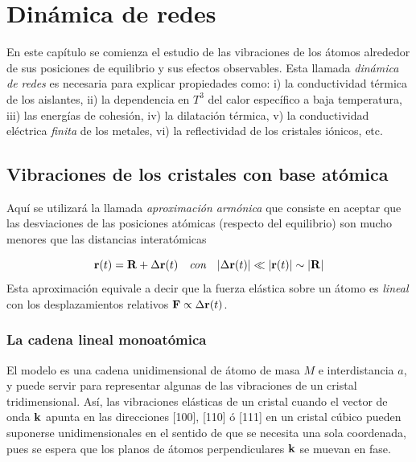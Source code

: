 
\chapter{Dinámica de redes} \label{Ch:04}

En este capítulo se comienza el estudio de las vibraciones de los átomos alrededor de sus posiciones de equilibrio y sus efectos observables. Esta llamada \textit{dinámica de redes} es necesaria para explicar propiedades como: i) la conductividad térmica de los aislantes, ii) la dependencia en $T^3$ del calor específico a baja temperatura, iii) las energías de cohesión, iv) la dilatación térmica, v) la conductividad eléctrica \textit{finita} de los metales, vi) la reflectividad de los cristales iónicos, etc.


\section{Vibraciones de los cristales con base atómica}

Aquí se utilizará la llamada \textit{aproximación armónica} que consiste en aceptar que las desviaciones de las posiciones atómicas (respecto del equilibrio) son mucho menores que las distancias interatómicas 

\begin{equation}
	\mathbf{r} (t) = \mathbf{R} + \Delta  \mathbf{r} (t)  \quad \textit{con} \quad |\Delta \mathbf{r} (t) | \ll |\mathbf{r} (t)| \sim |\mathbf{R}|
\end{equation}
Esta aproximación equivale a decir que la fuerza elástica sobre un átomo es \textit{lineal} con los desplazamientos relativos $\mathbf{F} \propto \Delta \mathbf{r} (t)$.

\subsection{La cadena lineal monoatómica}

El modelo es una cadena unidimensional de átomo de masa $M$ e interdistancia $a$, y  puede servir para representar algunas de las vibraciones de un cristal tridimensional. Así, las vibraciones elásticas de un cristal cuando el vector de onda $\mathbf{k}$ apunta en las direcciones [100], [110]  ó [111] en un cristal cúbico pueden suponerse unidimensionales en el sentido de que se necesita una sola coordenada, pues se espera que los planos de átomos perpendiculares $\mathbf{k}$ se muevan en fase. 

